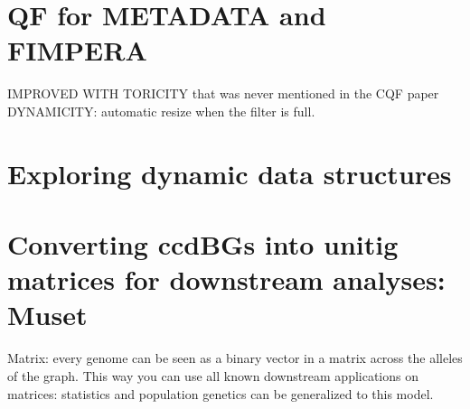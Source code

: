 \section{QF for METADATA and FIMPERA}
\label{sec:qf}
IMPROVED WITH TORICITY that was never mentioned in the CQF paper
DYNAMICITY: automatic resize when the filter is full.
\section{Exploring dynamic data structures}
\label{sec:skmers}




\section{Converting ccdBGs into unitig matrices for downstream analyses: Muset}
Matrix: every genome can be seen as a binary vector in a matrix across the alleles of the graph. This way you can use all known downstream applications on matrices: statistics and population genetics can be generalized to this model.



